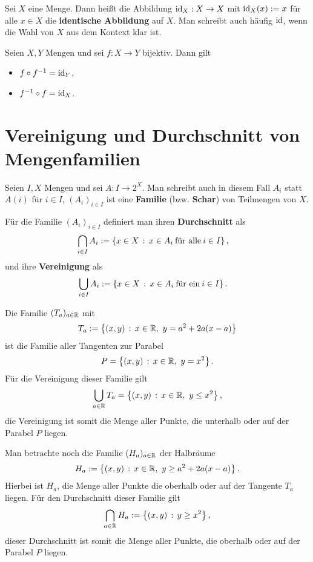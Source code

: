 \begin{defn}
Sei $ X $ eine Menge. Dann heißt die Abbildung $ \operatorname{id}_X : X \to X $ mit $ \operatorname{id}_X(x) := x $ für alle $ x \in X $ die \textbf{identische Abbildung} auf $ X $. Man schreibt auch häufig $ \operatorname{id} $, wenn die Wahl von  $ X $ aus dem Kontext klar ist. 
\end{defn}

\begin{bem}
	Seien $ X,Y $ Mengen und sei $ f : X \to Y $ bijektiv. Dann gilt
	\begin{itemize}
		\item $ f \circ f^{-1} = \operatorname{id}_Y $,
		\item $ f^{-1} \circ f = \operatorname{id}_X $.
	\end{itemize}
\end{bem} 

\section{Vereinigung und Durchschnitt von Mengenfamilien}

\begin{defn}
Seien $ I,X $ Mengen und sei $ A : I \to 2^X $. Man schreibt auch in diesem Fall $ A_i $ statt $ A(i) $ für $ i \in I $, $ (A_i)_{i \in I} $ ist eine \textbf{Familie} (bzw. \textbf{Schar}) von Teilmengen von $ X $.

Für die Familie $ (A_i)_{i \in I} $ definiert man ihren \textbf{Durchschnitt} als 
\begin{align*}
	\bigcap_{i \in I} A_i &:= \left\{ x \in X \,:\, x \in A_i \:\text{für alle}\: i \in I \right\},
\end{align*}
und ihre \textbf{Vereinigung} als 
\begin{align*}
	\bigcup_{i \in I} A_i &:= \left\{ x \in X \,:\, x \in A_i \:\text{für ein}\: i \in I \right\}.
\end{align*}
\end{defn} 

\begin{bsp} 
	Die Familie $(T_a)_{a \in \mathbb{R}}$ mit 
	\[
		T_a := \left\{  (x,y)  \,:\, x \in \mathbb{R}, \ y =  a^2 + 2  a (x-a) \right\}
	\]
	ist die Familie aller Tangenten zur Parabel 
	\[
	 	P = \left\{  (x,y)  \,:\, x \in \mathbb{R}, \ y = x^2 \right\}. 
	 \]
	 Für die Vereinigung dieser Familie gilt
	 \[
	 	\bigcup_{a \in \mathbb{R}} T_a  = \left\{  (x,y) \,:\, x \in \mathbb{R}, \ y \le x^2 \right\},
	 \]
	 die Vereinigung ist somit die Menge aller Punkte, die unterhalb oder auf der Parabel $P$ liegen. 
	 
	 Man betrachte noch die Familie $(H_a)_{a \in \mathbb{R}}$ der Halbräume 
	 \[
	 		H_a := \left\{ (x,y) \,:\, x \in \mathbb{R}, \ y \ge a^2 + 2 a (x-a) \right\}. 
	 \]
	 Hierbei ist $H_a$, die Menge aller Punkte die oberhalb oder auf der Tangente $T_a$ liegen. Für den Durchschnitt dieser Familie gilt 
	 \[
	 		\bigcap_{a \in \mathbb{R}} H_a := \left\{  (x,y)  \,:\, y \ge x^2 \right\},
	 \]
	 dieser Durchschnitt ist somit die Menge aller Punkte, die oberhalb oder auf der Parabel $P$ liegen. 
\end{bsp} 


